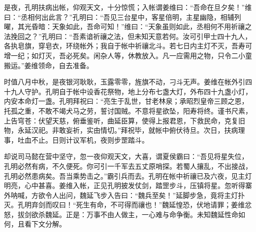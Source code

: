 是夜，孔明扶病出帐，仰观天文，十分惊慌；入帐谓姜维曰：“吾命在旦夕矣！”维曰：“丞相何出此言？”孔明曰：“吾见三台星中，客星倍明，主星幽隐，相辅列曜，其光昏暗：天象如此，吾命可知！”维曰：“天象虽则如此，丞相何不用祈禳之法挽回之？”孔明曰：“吾素谙祈禳之法，但未知天意若何。汝可引甲士四十九人，各执皂旗，穿皂衣，环绕帐外；我自于帐中祈禳北斗。若七日内主灯不灭，吾寿可增一纪；如灯灭，吾必死矣。闲杂人等，休教放入。凡一应需用之物，只令二小童搬运。”姜维领命，自去准备。

时值八月中秋，是夜银河耿耿，玉露零零，旌旗不动，刁斗无声。姜维在帐外引四十九人守护。孔明自于帐中设香花祭物，地上分布七盏大灯，外布四十九盏小灯，内安本命灯一盏。孔明拜祝曰：“亮生于乱世，甘老林泉；承昭烈皇帝三顾之恩，托孤之重，不敢不竭犬马之劳，誓讨国贼。不意将星欲坠，阳寿将终。谨书尺素，上告穹苍：伏望天慈，俯垂鉴听，曲延臣算，使得上报君恩，下救民命，克复旧物，永延汉祀。非敢妄祈，实由情切。”拜祝毕，就帐中俯伏待旦。次日，扶病理事，吐血不止。日则计议军机，夜则步罡踏斗。

却说司马懿在营中坚守，忽一夜仰观天文，大喜，谓夏侯霸曰：“吾见将星失位，孔明必然有病，不久便死。你可引一千军去五丈原哨探。若蜀人攘乱，不出接战，孔明必然患病矣。吾当乘势击之。”霸引兵而去。孔明在帐中祈禳已及六夜，见主灯明亮，心中甚喜。姜维入帐，正见孔明披发仗剑，踏罡步斗，压镇将星。忽听得寨外呐喊，方欲令人出问，魏延飞步入告曰：“魏兵至矣！”延脚步急，竟将主灯扑灭。孔明弃剑而叹曰！“死生有命，不可得而禳也！”魏延惶恐，伏地请罪；姜维忿怒，拔剑欲杀魏延。正是：万事不由人做主，一心难与命争衡。未知魏延性命如何，且看下文分解。